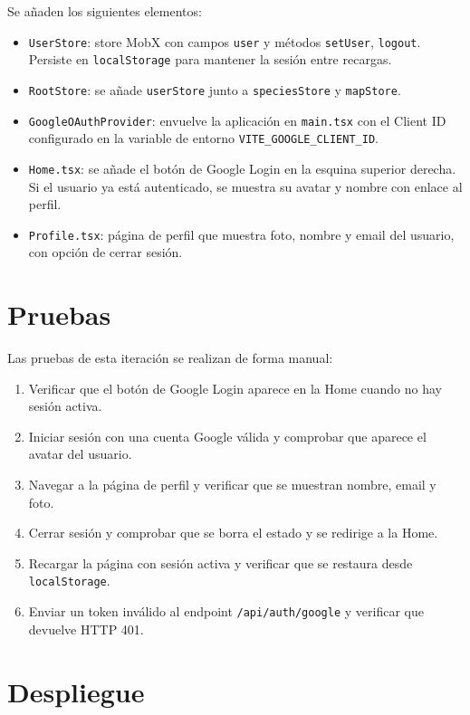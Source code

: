 Se añaden los siguientes elementos:

\begin{itemize}
    \item \texttt{UserStore}: store MobX con campos \texttt{user} y métodos \texttt{setUser}, \texttt{logout}. Persiste en \texttt{localStorage} para mantener la sesión entre recargas.
    \item \texttt{RootStore}: se añade \texttt{userStore} junto a \texttt{speciesStore} y \texttt{mapStore}.
    \item \texttt{GoogleOAuthProvider}: envuelve la aplicación en \texttt{main.tsx} con el Client ID configurado en la variable de entorno \texttt{VITE\_GOOGLE\_CLIENT\_ID}.
    \item \texttt{Home.tsx}: se añade el botón de Google Login en la esquina superior derecha. Si el usuario ya está autenticado, se muestra su avatar y nombre con enlace al perfil.
    \item \texttt{Profile.tsx}: página de perfil que muestra foto, nombre y email del usuario, con opción de cerrar sesión.
\end{itemize}

\section{Pruebas}

Las pruebas de esta iteración se realizan de forma manual:

\begin{enumerate}
    \item Verificar que el botón de Google Login aparece en la Home cuando no hay sesión activa.
    \item Iniciar sesión con una cuenta Google válida y comprobar que aparece el avatar del usuario.
    \item Navegar a la página de perfil y verificar que se muestran nombre, email y foto.
    \item Cerrar sesión y comprobar que se borra el estado y se redirige a la Home.
    \item Recargar la página con sesión activa y verificar que se restaura desde \texttt{localStorage}.
    \item Enviar un token inválido al endpoint \texttt{/api/auth/google} y verificar que devuelve HTTP 401.
\end{enumerate}

\section{Despliegue}

